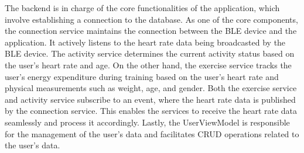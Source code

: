 The backend is in charge of the core functionalities of the application, which involve establishing a connection to the database.
As one of the core components, the connection service maintains the connection between the BLE device and the application. It actively listens to the heart rate data being broadcasted by the BLE device. 
The activity service determines the current activity status based on the user's heart rate and age. 
On the other hand, the exercise service tracks the user's energy expenditure during training based on the user's heart rate and physical measurements such as weight, age, and gender. Both the exercise service and activity service subscribe to an event, where the heart rate data is published by the connection service. This enables the services to receive the heart rate data seamlessly and process it accordingly.
Lastly, the UserViewModel is responsible for the management of the user's data and facilitates CRUD operations related to the user's data.
